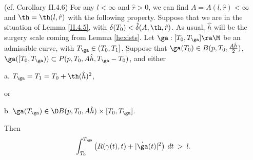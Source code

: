 \begin{corollary}
  \label{cor:kl-curves-that-penetrate-surgery-region-ricci-flow-surgery-corollary}
 (cf. Corollary II.4.6)
\label{corollaryII.4.6}
For any $l<\infty$ and $\hat r>0$, we can find $A=A(l,\hat r)<\infty$ and
$\th=\th(l,\hat r)$ with the following property.
Suppose that we are in the situation of Lemma \ref{II.4.5}, with
$\delta(T_0) < \hat{\delta}(A, \th, \hat r)$.
As usual,
$\hat h$ will be the surgery scale coming from Lemma \ref{hexists}.
Let $\ga:[T_0,T_\ga]\ra \M$
be an admissible curve, with
$T_\ga\in (T_0,T_1]$.
Suppose that
$\ga(T_0)\in B(p,T_0,\frac{A\hat h}{2})$,
$\ga([T_0,T_\ga))\subset P(p,T_0,A\hat h, T_\ga-T_0)$, and
either

a. $T_\ga=T_1=T_0+\th(\hat h)^2$,

or

b. $\ga(T_\ga)\in\D B(p,T_0,A\hat h)\times [T_0,T_\ga]$.

Then
\begin{equation}
\int_{T_0}^{T_\ga} \left( R(\gamma(t),t)+|\dot{\ga}(t)|^2 \right) \: dt
\: > \: l.
\end{equation}
\end{corollary}
